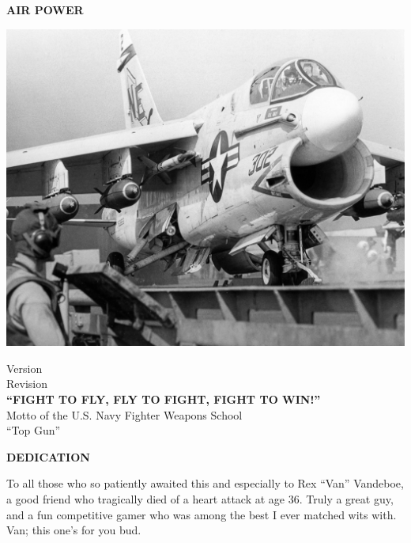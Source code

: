 \thispagestyle{empty}

\begin{minipage}{\linewidth}
\vspace*{10ex}
\begin{center}
{\Huge \textbf{AIR POWER}}\\
\vspace{10ex}
\begin{center}
\includegraphics[width=0.8\linewidth]{cover.jpg}
\end{center}
\vspace{10ex}
Version \thisversion\\[\smallskipamount]
Revision \thisrevision\\
\vspace{5ex}
\textbf{“FIGHT TO FLY, FLY TO FIGHT, FIGHT TO WIN!”}\\
\vspace{1ex}
Motto of the U.S. Navy Fighter Weapons School\\
\vspace{1ex}
“Top Gun”
\vspace{1ex}
\end{center}
\vspace{1ex}
\end{minipage}

\twocolumn

\begin{center}

\textbf{DEDICATION}
\end{center}

To all those who so patiently awaited this and especially to Rex “Van” Vandeboe, a good friend who tragically died of a heart attack at age 36. Truly a great guy, and a fun competitive gamer who was among the best I ever matched wits with. Van; this one’s for you bud.

